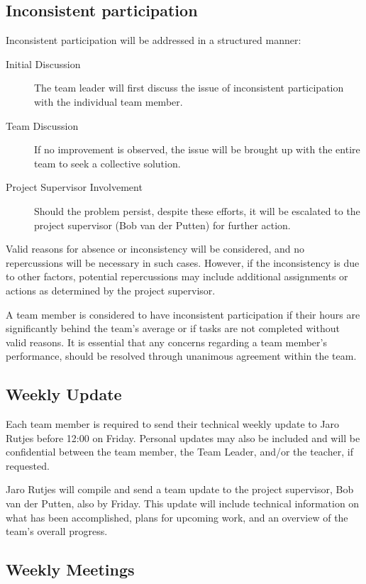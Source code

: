 \documentclass{projdoc}
\begin{document}
\subsection{Inconsistent participation}

Inconsistent participation will be addressed in a structured manner:

\begin{description}
	\item[Initial Discussion] The team leader will first discuss the issue of
		inconsistent participation with the individual team member.
	\item [Team Discussion] If no improvement is observed, the issue will be brought up
		with the entire team to seek a collective solution.
	\item [Project Supervisor Involvement] Should the problem persist, despite these
		efforts, it will be escalated to the project supervisor (Bob van der Putten) for
		further action.
\end{description}

Valid reasons for absence or inconsistency will be considered, and no repercussions
will be necessary in such cases. However, if the inconsistency is due to other
factors, potential repercussions may include additional assignments or actions as
determined by the project supervisor.

A team member is considered to have inconsistent participation if their hours
are significantly behind the team’s average or if tasks are not completed
without valid reasons. It is essential that any concerns regarding a team
member's performance, should be resolved through unanimous agreement within the team.

\subsection{Weekly Update}

Each team member is required to send their technical weekly update to Jaro Rutjes
before 12:00 on Friday. Personal updates may also be included and will be
confidential between the team member, the Team Leader, and/or the teacher, if
requested.

Jaro Rutjes will compile and send a team update to the project supervisor, Bob
van der Putten, also by Friday. This update will include technical information
on what has been accomplished, plans for upcoming work, and an overview of the
team's overall progress.

\subsection{Weekly Meetings}
\end{document}
